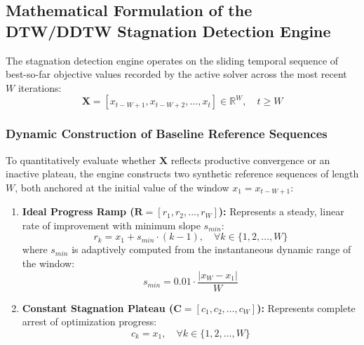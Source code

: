 \subsection{Mathematical Formulation of the DTW/DDTW Stagnation Detection Engine}
\label{sec:dtw_formulation}

The stagnation detection engine operates on the sliding temporal sequence of best-so-far objective values recorded by the active solver across the most recent $W$ iterations:
\begin{equation}
\mathbf{X} = \left[ x_{t-W+1}, x_{t-W+2}, \dots, x_t \right] \in \mathbb{R}^W, \quad t \ge W
\label{eq:sliding_window}
\end{equation}

\subsubsection{Dynamic Construction of Baseline Reference Sequences}

To quantitatively evaluate whether $\mathbf{X}$ reflects productive convergence or an inactive plateau, the engine constructs two synthetic reference sequences of length $W$, both anchored at the initial value of the window $x_1 = x_{t-W+1}$:

\begin{enumerate}
    \item \textbf{Ideal Progress Ramp ($\mathbf{R} = [r_1, r_2, \dots, r_W]$):} Represents a steady, linear rate of improvement with minimum slope $s_{min}$:
    \begin{equation}
    r_k = x_1 + s_{min} \cdot (k - 1), \quad \forall k \in \{1, 2, \dots, W\}
    \label{eq:ramp_baseline}
    \end{equation}
    where $s_{min}$ is adaptively computed from the instantaneous dynamic range of the window:
    \begin{equation}
    s_{min} = 0.01 \cdot \frac{|x_W - x_1|}{W}
    \label{eq:adaptive_slope}
    \end{equation}

    \item \textbf{Constant Stagnation Plateau ($\mathbf{C} = [c_1, c_2, \dots, c_W]$):} Represents complete arrest of optimization progress:
    \begin{equation}
    c_k = x_1, \quad \forall k \in \{1, 2, \dots, W\}
    \label{eq:constant_baseline}
    \end{equation}
\end{enumerate}

